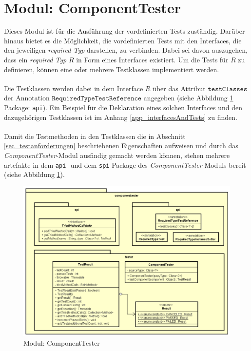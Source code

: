 \section{Modul: ComponentTester}\label{sec_Impl_CT}
Dieses \Gls{Modul} ist für die Ausführung der vordefinierten Tests zuständig. Darüber hinaus bietet es die Möglichkeit, die vordefinierten Tests mit den \Gls{Interface}s, die den jeweiligen \emph{required Typ} darstellen, zu verbinden. Dabei sei davon auszugehen, dass ein \emph{required Typ} $R$ in Form eines \Gls{Interface}s existiert. Um die Tests für $R$ zu definieren, können eine oder mehrere Testklassen implementiert werden.
\\\\
Die Testklassen werden dabei in dem \Gls{Interface} $R$ über das Attribut $\texttt{testClasses}$ der Annotation $\texttt{RequiredTypeTestReference}$ angegeben (siehe Abbildung \ref{fig_cdCompTester} Package: \texttt{api}). Ein Beispiel für die Deklaration eines solchen \Gls{Interface}s und den dazugehörigen Testklassen ist im Anhang \ref{app_interfacesAndTests} zu finden.
\\\\
Damit die Testmethoden in den Testklassen die in Abschnitt \ref{sec_testanforderungen} beschriebenen Eigenschaften aufweisen und durch das \emph{ComponentTester}-\Gls{Modul} ausfindig gemacht werden können, stehen mehrere \Gls{artefakt}e in dem \texttt{api}- und dem \texttt{spi}-Package des \emph{ComponentTester}-\Gls{Modul}s bereit (siehe Abbildung \ref{fig_cdCompTester}).
\begin{figure}[H]
\centering
\includegraphics[scale=0.6]{pics/cd_ComponentTester.png}
\caption{Modul: ComponentTester}
\label{fig_cdCompTester}
\end{figure}

